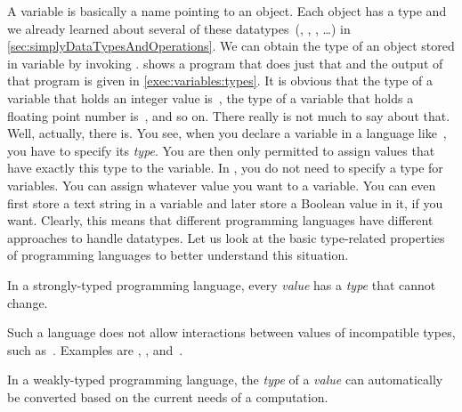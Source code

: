 %
\label{sec:variableTypesAndTypeHints}%
%
%
%
%
%
A variable is basically a name pointing to an object.
Each object has a type and we already learned about several of these datatypes~(, , , \dots) in \cref{sec:simplyDataTypesAndOperations}.
We can obtain the type of an object stored in variable  by invoking .
 shows a program  that does just that and the output of that program is given in \cref{exec:variables:types}.
It is obvious that the type of a variable that holds an integer value is~, the type of a variable that holds a floating point number is~, and so on.
There really is not much to say about that.%
\endhsection%
%
%
\label{sec:typesAndConfusion}%
\FloatBarrier%
%
%
%
%
Well, actually, there is.
You see, when you declare a variable in a language like~, you have to specify its \emph{type}.
You are then only permitted to assign values that have exactly this type to the variable.
In \python, you do not need to specify a type for variables.
You can assign whatever value you want to a variable.
You can even first store a text string in a variable and later store a Boolean value in it, if you want.
Clearly, this means that different programming languages have different approaches to handle datatypes.
Let us look at the basic type-related properties of programming languages to better understand this situation.%
%
\begin{definition}%
In a strongly-typed programming language, every \emph{value} has a \emph{type} that cannot change.%
\end{definition}%
%
Such a language does not allow interactions between values of incompatible types, such as~.
Examples are \python, , and~.%
%
\begin{definition}%
In a weakly-typed programming language, the \emph{type} of a \emph{value} can automatically be converted based on the current needs of a computation.%
\end{definition}%
